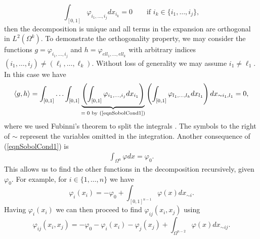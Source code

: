 \documentclass[12pt]{book}
\begin{document}
\begin{equation}\label{eqnSobolCond1}
\int_{[0,1]}\varphi_{i_{1},\ldots,i_{j}}dx_{i_{k}}=0\qquad\text{if }  i_{k}\in \{i_{1},\ldots,i_{j}\},
\end{equation}
then the decomposition is unique and all terms in the expansion are orthogonal in $L^{2}(\Omega^{k})$. To 
demonstrate  the orthogonality property, 
we may  consider the functions $g=\varphi_{i_{1},\ldots,i_{j}}$ and $h=\varphi_{ell_{1},\ldots,ell_{k}}$ 
with arbitrary indices $(i_{1},\ldots,i_{j})\neq(\ell_{i},\ldots,\ell_{k})$. Without 
loss of generality we may  assume $i_{1}\neq \ell_{1}$. In this case we have
\begin{equation*}
\langle g,h\rangle=\int_{[0,1]}\ldots\int_{[0,1]}\underbrace{\left(\int_{[0,1]}\varphi_{i_{1},
\ldots,i_{j}}dx_{i_{1}}\right)}_{\text{$=0$ by (\ref{eqnSobolCond1})}}
\left(\int_{[0,1]}\varphi_{l_{1},\ldots,l_{k}}dx_{l_{1}}\right)dx_{\sim i_{1},l_{1}}=0,
\end{equation*}
where we used Fubinni's theorem to split the integrals \cite{lerner2014course}. The symbols to the right of $\sim$ 
represent the variables omitted in the integration.
Another consequence of  (\ref{eqnSobolCond1}) is 
\begin{eqnarray*}
\int_{\Omega^{n}}\varphi dx=\varphi_{0}.
\end{eqnarray*}
This allows us to find  the other functions in the decomposition recursively,
given $\varphi_{0}$. For example, 
for $i\in \{1,\ldots,n\}$ we have
\begin{equation*}
\varphi_{i}(x_{i})=-\varphi_{0}+\int_{[0,1]^{n-1}}\varphi(x)dx_{\sim i}.
\end{equation*}
Having $\varphi_{i}(x_{i})$ we can then proceed to find $\varphi_{ij}(x_{i},x_{j})$ using
\begin{equation*}
\varphi_{ij}(x_{i},x_{j})=-\varphi_{0}-\varphi_{i}(x_{i})-\varphi_{j}(x_{j})+
\int_{\Omega^{n-2}}\varphi(x)dx_{\sim ij}.
\end{equation*}
\end{document}
